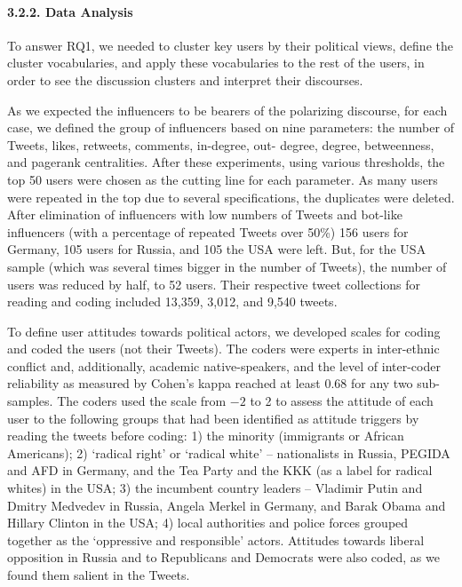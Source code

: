 \paragraph{3.2.2. Data Analysis}

To answer RQ1, we needed to cluster key users by their political views, define the cluster vocabularies, and apply these vocabularies to the rest of the users, in order to see the discussion clusters and interpret their discourses.

As we expected the influencers to be bearers of the polarizing discourse, for each case, we defined the group of influencers based on nine parameters: the number of Tweets, likes, retweets, comments, in-degree, out- degree, degree, betweenness, and pagerank centralities. After these experiments, using various thresholds, the top 50 users were chosen as the cutting line for each parameter. As many users were repeated in the top due to several specifications, the duplicates were deleted. After elimination of influencers with low numbers of Tweets and bot-like influencers (with a percentage of repeated Tweets over 50\%) 156 users for Germany, 105 users for Russia, and 105 the USA were left. But, for the USA sample (which was several times bigger in the number of Tweets), the number of users was reduced by half, to 52 users. Their respective tweet collections for reading and coding included 13,359, 3,012, and 9,540 tweets.

To define user attitudes towards political actors, we developed scales for coding and coded the users (not their Tweets). The coders were experts in inter-ethnic conflict and, additionally, academic native-speakers, and the level of inter-coder reliability as measured by Cohen’s kappa reached at least 0.68 for any two sub-samples. The coders used the scale from \(-2\) to 2 to assess the attitude of each user to the following groups that had been identified as attitude triggers by reading the tweets before coding: 1) the minority (immigrants or African Americans); 2) ‘radical right’ or ‘radical white’ -- nationalists in Russia, PEGIDA and AFD in Germany, and the Tea Party and the KKK (as a label for radical whites) in the USA; 3) the incumbent country leaders -- Vladimir Putin and Dmitry Medvedev in Russia, Angela Merkel in Germany, and Barak Obama and Hillary Clinton in the USA; 4) local authorities and police forces grouped together as the ‘oppressive and responsible’ actors. Attitudes towards liberal opposition in Russia and to Republicans and Democrats were also coded, as we found them salient in the Tweets.

